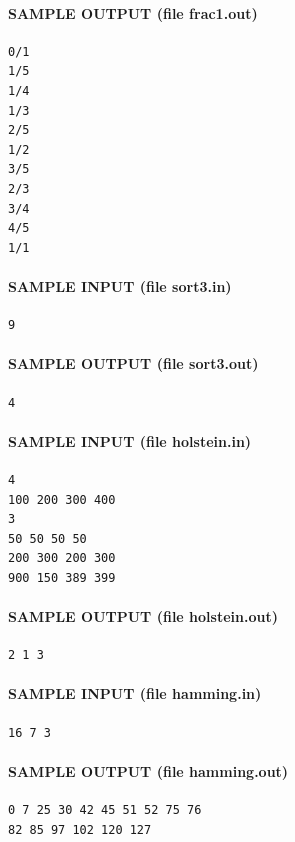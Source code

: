 \documentclass[11pt]{article}
\begin{document}
\paragraph{SAMPLE OUTPUT (file frac1.out)}
\begin{verbatim}
0/1
1/5
1/4
1/3
2/5
1/2
3/5
2/3
3/4
4/5
1/1
\end{verbatim}

\paragraph{SAMPLE INPUT (file sort3.in)}
\begin{verbatim}
9
\end{verbatim}

\paragraph{SAMPLE OUTPUT (file sort3.out)}
\begin{verbatim}
4
\end{verbatim}

\paragraph{SAMPLE INPUT (file holstein.in)}
\begin{verbatim}
4
100 200 300 400
3
50 50 50 50
200 300 200 300
900 150 389 399
\end{verbatim}

\paragraph{SAMPLE OUTPUT (file holstein.out)}
\begin{verbatim}
2 1 3
\end{verbatim}

\paragraph{SAMPLE INPUT (file hamming.in)}
\begin{verbatim}
16 7 3
\end{verbatim}

\paragraph{SAMPLE OUTPUT (file hamming.out)}
\begin{verbatim}
0 7 25 30 42 45 51 52 75 76
82 85 97 102 120 127
\end{verbatim}
\end{document}
